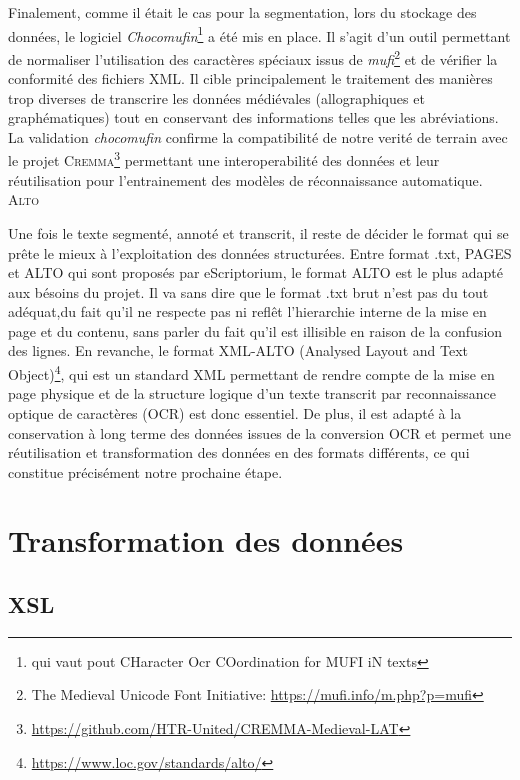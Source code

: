 \documentclass[a4paper, twoside, 12pt]{book}
\begin{document}
Finalement, comme il était le cas pour la segmentation, lors du stockage des données, le logiciel \textit{Chocomufin}\footnote{ qui vaut pout CHaracter Ocr COordination for MUFI iN texts\cite{Clerice_Choco-Mufin_a_tool_2021}} a été mis en place. Il s'agit d'un outil permettant de normaliser l'utilisation des caractères spéciaux issus de \textit{mufi}\footnote{The Medieval Unicode Font Initiative: \url{https://mufi.info/m.php?p=mufi}} et de vérifier la conformité des fichiers XML. Il cible principalement le traitement des manières trop diverses de transcrire les données médiévales (allographiques et graphématiques) tout en conservant des informations telles que les abréviations. La validation \textit{chocomufin} confirme la compatibilité de notre verité de terrain avec le projet \textsc{Cremma}\footnote{\url{https://github.com/HTR-United/CREMMA-Medieval-LAT}} permettant une interoperabilité des données et leur réutilisation pour l'entrainement des modèles de réconnaissance automatique. \\

\textsc{Alto}

Une fois le texte segmenté, annoté et transcrit, il reste de décider le format qui se prête le mieux à l'exploitation des données structurées. Entre format .txt, PAGES et ALTO qui sont proposés par eScriptorium, le format ALTO est le plus adapté aux bésoins du projet. Il va sans dire que le format .txt brut n'est pas du tout adéquat,du fait qu'il ne respecte pas ni reflêt l'hierarchie interne de la mise en page et du contenu, sans parler du fait qu'il est illisible en raison de la confusion des lignes. En revanche, le format XML-ALTO (Analysed Layout and Text Object)\footnote{\url{https://www.loc.gov/standards/alto/}}, qui est un standard XML permettant de rendre compte de la mise en page physique et de la structure logique d'un texte transcrit par reconnaissance optique de caractères (OCR) est donc essentiel. De plus, il est adapté à la conservation à long terme des données issues de la conversion OCR et permet une réutilisation et transformation des données en des formats différents, ce qui constitue précisément notre prochaine étape.\\

\section{Transformation des données}

\subsection{XSL}
\end{document}
